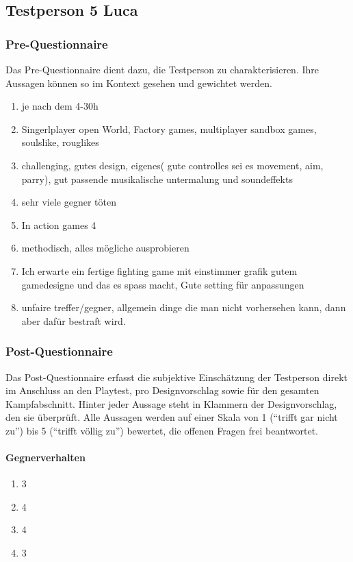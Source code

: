 \documentclass[../Main.tex]{subfiles}
\begin{document}
\subsection{Testperson 5 Luca}
\subsubsection{Pre-Questionnaire}

Das Pre-Questionnaire dient dazu, die Testperson zu charakterisieren. Ihre Aussagen können so im Kontext gesehen und gewichtet werden.

\begin{enumerate}[label=\textbf{P\arabic*}, leftmargin=1.5cm, itemsep=0.5em]
\item je nach dem 4-30h
\item Singerlplayer open World, Factory games, multiplayer sandbox games, soulslike, rouglikes
\item challenging, gutes design, eigenes( gute controlles sei es movement, aim, parry), gut passende musikalische untermalung und soundeffekts
\item sehr viele gegner töten
\item In action games 4
\item methodisch, alles mögliche ausprobieren
\item Ich erwarte ein fertige fighting game mit einstimmer grafik gutem gamedesigne und das es spass macht, Gute setting für anpassungen
\item unfaire treffer/gegner, allgemein dinge die man nicht vorhersehen kann, dann aber dafür bestraft wird.
\end{enumerate}

\subsubsection{Post-Questionnaire}

Das Post-Questionnaire erfasst die subjektive Einschätzung der Testperson direkt im Anschluss an den Playtest, pro Designvorschlag sowie für den gesamten Kampfabschnitt. Hinter jeder Aussage steht in Klammern der Designvorschlag, den sie überprüft. Alle Aussagen werden auf einer Skala von 1 (\enquote{trifft gar nicht zu}) bis 5 (\enquote{trifft völlig zu}) bewertet, die offenen Fragen frei beantwortet.

\paragraph{Gegnerverhalten}
\begin{enumerate}[label=\textbf{Q\arabic*}, leftmargin=1.5cm, itemsep=0.5em]
\item 3
\item 4
\item 4
\item 3
\end{enumerate}
\end{document}
